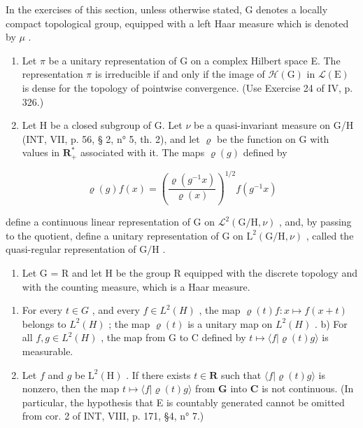 \exercisesection{}

In the exercises of this section, unless otherwise stated, G denotes a locally compact topological group, equipped with a left Haar measure which is denoted by \(\mu\) .

\begin{enumerate}
\def\labelenumi{\arabic{enumi})}
\item
  Let \(\pi\) be a unitary representation of G on a complex Hilbert space E. The representation \(\pi\) is irreducible if and only if the image of \(\mathcal{H}(\mathrm{G})\) in \(\mathcal{L}(\mathrm{E})\) is dense for the topology of pointwise convergence. (Use Exercise 24 of IV, p. 326.)
\item
  Let H be a closed subgroup of G. Let \(\nu\) be a quasi-invariant measure on G/H (INT, VII, p. 56, § 2, n° 5, th. 2), and let \(\varrho\) be the function on G with values in \(\mathbf{R}_{+}^{*}\) associated with it. The maps \(\varrho(g)\) defined by
\end{enumerate}

\[
\varrho (g) f (x) = \left(\frac {\varrho (g ^ {- 1} x)}{\varrho (x)}\right) ^ {1 / 2} f (g ^ {- 1} x)
\]

define a continuous linear representation of G on \(\mathcal{L}^{2}(\mathrm{G / H},\nu)\) , and, by passing to the quotient, define a unitary representation of G on \(\mathrm{L}^2 (\mathrm{G / H},\nu)\) , called the quasi-regular representation of \(\mathrm{G / H}\) .

\begin{enumerate}
\def\labelenumi{\arabic{enumi})}
\setcounter{enumi}{2}
\tightlist
\item
  Let G = R and let H be the group R equipped with the discrete topology and with the counting measure, which is a Haar measure.
\end{enumerate}

\begin{enumerate}
\def\labelenumi{\alph{enumi})}
\item
  For every \(t \in G\) , and every \(f \in L^{2}(H)\) , the map \(\varrho(t)f: x \mapsto f(x + t)\) belongs to \(L^{2}(H)\) ; the map \(\varrho(t)\) is a unitary map on \(L^{2}(H)\) . b) For all \(f,g \in L^{2}(H)\) , the map from G to C defined by \(t \mapsto \langle f | \varrho(t)g \rangle\) is measurable.
\item
  Let \(f\) and \(g\) be \(\mathrm{L}^2(\mathrm{H})\) . If there exists \(t \in \mathbf{R}\) such that \(\langle f | \varrho(t)g \rangle\) is nonzero, then the map \(t \mapsto \langle f | \varrho(t)g \rangle\) from \(\mathbf{G}\) into \(\mathbf{C}\) is not continuous. (In particular, the hypothesis that E is countably generated cannot be omitted from cor. 2 of INT, VIII, p. 171, §4, n° 7.)
\end{enumerate}

